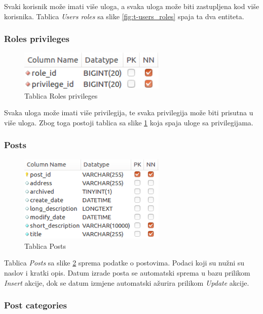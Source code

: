 \documentclass[zavrsni, numeric]{fer}
\begin{document}
Svaki korisnik može imati više uloga, a svaka uloga može biti zastupljena kod više korisnika. Tablica \textit{Users roles} sa slike \ref{fig:t-users_roles} spaja ta dva entiteta.

\subsubsection{Roles privileges}

\begin{figure}[H]
	\centering
	\includegraphics[width=7cm]{slike/t-roles_privileges.png}
	\caption{Tablica Roles privileges}
	\label{fig:t-roles_privileges}
\end{figure}

Svaka uloga može imati više privilegija, te svaka privilegija može biti prisutna u više uloga. Zbog toga postoji tablica sa slike \ref{fig:t-roles_privileges} koja spaja uloge sa privilegijama.

\subsubsection{Posts}

\begin{figure}[H]
	\centering
	\includegraphics[width=7cm]{slike/t-posts.png}
	\caption{Tablica Posts}
	\label{fig:t-posts}
\end{figure}

Tablica \textit{Posts} sa slike \ref{fig:t-posts} sprema podatke o postovima. Podaci koji su nužni su naslov i kratki opis. Datum izrade posta se automatski sprema u bazu prilikom \textit{Insert} akcije, dok se datum izmjene automatski ažurira prilikom \textit{Update} akcije.

\subsubsection{Post categories}
\end{document}
